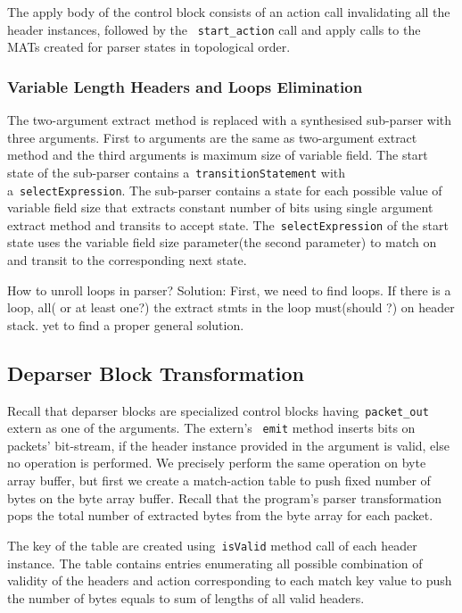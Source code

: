 The apply body of the control block consists of an action call invalidating all the header instances, followed by the ~\texttt{start\_action} call and apply calls to the MATs created for parser states in topological order.



\subsubsection{Variable Length Headers and Loops Elimination}
\label{variable-length-headers-loops-and-elimination}
The two-argument extract method is replaced with a synthesised sub-parser with three arguments.
First to arguments are the same as two-argument extract method and the third arguments is maximum size of variable field.
The start state of the sub-parser contains a~\texttt{transition\-Statement} with a~\texttt{select\-Expression}.
The sub-parser contains a state for each possible value of variable field size that extracts constant number of bits using single argument extract method and transits to accept state.
The~\texttt{select\-Expression} of the start state uses the variable field size parameter(the second parameter) to match on and transit to the corresponding next state.

How to unroll loops in parser? 
Solution: First, we need to find loops. 
If there is a loop, all( or at least one?) the extract stmts in the loop must(should ?) on header stack.
yet to find a proper general solution.


\subsection{Deparser Block Transformation}
\label{subsection:deparser-block-transformation}
Recall that deparser blocks are specialized control blocks having~\texttt{packet\_out} extern as one of the arguments.
The extern's ~\texttt{emit} method inserts bits on packets' bit-stream, if the header instance provided in the argument is valid, else no operation is performed.
We precisely perform the same operation on byte array buffer, but first we create a match-action table to push fixed number of bytes on the byte array buffer.
Recall that the program's parser transformation pops the total number of extracted bytes from the byte array for each packet.

The key of the table are created using~\texttt{isValid} method call of each header instance.
The table contains entries enumerating all possible combination of validity of the headers and action corresponding to each match key value to push the number of bytes equals to sum of lengths of all valid headers.


